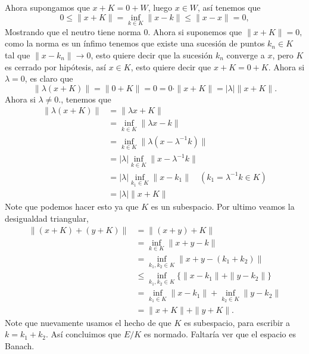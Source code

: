 \begin{itemize}
\begin{itemize}
\begin{sproof}
            Ahora supongamos que $x+K=0+W$, luego $x\in W$, así tenemos que 
            $$0\leq \|x+K\|=\inf_{k\in K}\|x-k\|\leq \|x-x\|=0,$$
            Mostrando que el neutro tiene norma $0.$ Ahora si suponemos que $\|x+K\|=0,$ como la norma es un ínfimo tenemos que existe una sucesión de puntos $k_n\in K$ tal que $\|x-k_n\|\to 0$, esto quiere decir que la sucesión $k_n$ converge a $x$, pero $K$ es cerrado por hipótesis, así $x\in K$, esto quiere decir que $x+K=0+K$. Ahora si $\lambda=0$, es claro que 
            $$\|\lambda(x+K)\|=\|0+K\|=0=0\cdot\|x+K\|=|\lambda|\|x+K\|.$$
            Ahora si $\lambda\neq 0.$, tenemos que
            \begin{align*}
                \|\lambda(x+K)\|&=\|\lambda x+K\|\\
                &=\inf_{k\in K}\|\lambda x-k\|\\
                &=\inf_{k\in K}\|\lambda(x-\lambda^{-1}k)\|\\
                &=|\lambda|\inf_{k\in K}\|x-\lambda^{-1}k\|\\
                &=|\lambda|\inf_{k_1\in K}\|x-k_1\|\quad (k_1=\lambda^{-1}k\in K)\\
                &=|\lambda|\|x+K\|
            \end{align*}
            Note que podemos hacer esto ya que $K$ es un subespacio. Por ultimo veamos la desigualdad triangular,
            \begin{align*}
                \|(x+K)+(y+K)\|&=\|(x+y)+K\|\\
                &=\inf_{k\in K}\|x+y-k\|\\
                &=\inf_{k_1,k_2\in K}\|x+y-(k_1+k_2)\|\\
                &\leq \inf_{k_1,k_2\in K}\{\|x-k_1\|+\|y-k_2\|\}\\
                &=\inf_{k_1\in K}\|x-k_1\|+\inf_{k_2\in K}\|y-k_2\|\\
                &=\|x+K\|+\|y+K\|.
            \end{align*}
            Note que nuevamente usamos el hecho de que $K$ es subespacio, para escribir a $k=k_1+k_2.$ Así concluimos que $E/K$ es normado. Faltaría ver que el espacio es Banach.\\


\end{sproof}
\end{itemize}
\end{itemize}
